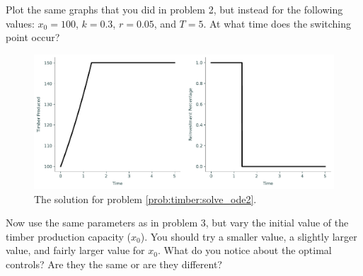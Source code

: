 \begin{problem}
\label{prob:timber:solve_ode2}
Plot the same graphs that you did in problem 2, but instead for the following values: $x_0 = 100$, $k = 0.3$, $r = 0.05$, and $T = 5$. At what time does the switching point occur?

\end{problem}
\begin{figure}[H]
\includegraphics[width=\textwidth]{figures/Example_problem3.pdf}
\caption{The solution for problem \ref{prob:timber:solve_ode2}.}
\end{figure}


\begin{problem}
Now use the same parameters as in problem 3, but vary the initial value of the timber production capacity ($x_{0}$).
You should try a smaller value, a slightly larger value, and fairly larger value for $x_{0}$.
What do you notice about the optimal controls?
Are they the same or are they different?

\end{problem}


